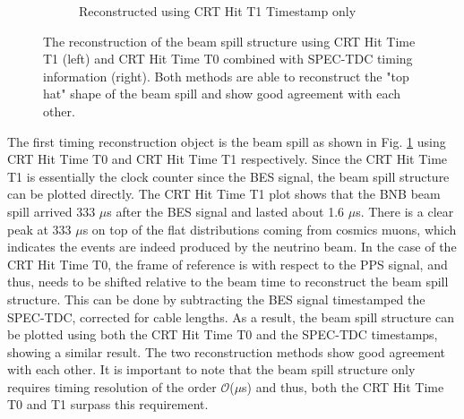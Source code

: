 \begin{figure}[htbp!]
\begin{subfigure}[h]{0.49\linewidth}
\caption{Reconstructed using CRT Hit T1 Timestamp only}
\end{subfigure}%
\caption{The reconstruction of the beam spill structure using CRT Hit Time T1 (left) and CRT Hit Time T0 combined with SPEC-TDC timing information (right). 
Both methods are able to reconstruct the "top hat" shape of the beam spill and show good agreement with each other.
}
\label{fig:top_hat}
\end{figure}

The first timing reconstruction object is the beam spill as shown in Fig. \ref{fig:top_hat} using CRT Hit Time T0 and CRT Hit Time T1 respectively.
Since the CRT Hit Time T1 is essentially the clock counter since the BES signal, the beam spill structure can be plotted directly.
The CRT Hit Time T1 plot shows that the BNB beam spill arrived 333 $\mu$s after the BES signal and lasted about 1.6 $\mu$s.
There is a clear peak at 333 $\mu$s on top of the flat distributions coming from cosmics muons, which indicates the events are indeed produced by the neutrino beam.
In the case of the CRT Hit Time T0, the frame of reference is with respect to the PPS signal, and thus, needs to be shifted relative to the beam time to reconstruct the beam spill structure.
This can be done by subtracting the BES signal timestamped the SPEC-TDC, corrected for cable lengths.
As a result, the beam spill structure can be plotted using both the CRT Hit Time T0 and the SPEC-TDC timestamps, showing a similar result.
The two reconstruction methods show good agreement with each other.
It is important to note that the beam spill structure only requires timing resolution of the order $\mathcal{O}$($\mu$s) and thus, both the CRT Hit Time T0 and T1 surpass this requirement.

